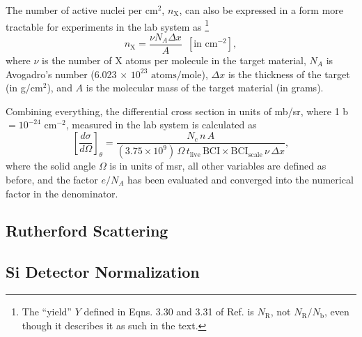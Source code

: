 The number of active nuclei per $\mathrm{cm}^{2}$, $n_{\mathrm{X}}$, can also be expressed in a form more tractable for experiments in the lab system as \cite{Rolfs1988,SetoodehniaThesis}\footnote{The ``yield'' $Y$ defined in Eqns. 3.30 and 3.31 of Ref. \cite{SetoodehniaThesis} is $N_{\mathrm{R}}$, not $N_{\mathrm{R}}/N_{\mathrm{b}}$, even though it describes it as such in the text.}
\begin{equation}
n_{\mathrm{X}} = \frac{\nu N_{A} \Delta x}{A} \,\,\, [\mathrm{in \,\, cm}^{-2}],
\end{equation}
where $\nu$ is the number of $\mathrm{X}$ atoms per molecule in the target material, $N_{A}$ is Avogadro's number (6.023 $\times$ $10^{23}$ $\mathrm{atoms}/\mathrm{mole}$), $\Delta x$ is the thickness of the target (in g/$\mathrm{cm}^{2}$), and $A$ is the molecular mass of the target material (in grams).

Combining everything, the differential cross section in units of mb/sr, where 1 b $ = 10^{-24}$ $\mathrm{cm}^{-2}$, measured in the lab system is calculated as
\begin{equation}
\left[ \frac{d\sigma}{d\Omega} \right]_{\theta} = \frac{N_{c} \, n \, A}{(3.75 \times 10^{9}) \, \Omega \, t_{\mathrm{live}} \, \mathrm{BCI} \times \mathrm{BCI}_{\mathrm{scale}} \, \nu \, \Delta x},
\end{equation}
where the solid angle $\Omega$ is in units of msr, all other variables are defined as before, and the factor $e/N_{A}$ has been evaluated and converged into the numerical factor in the denominator.

\subsection{Rutherford Scattering} \label{subsec:Ruth}



\subsection{Si Detector Normalization} \label{subsec:SiNorm}

\newpage

